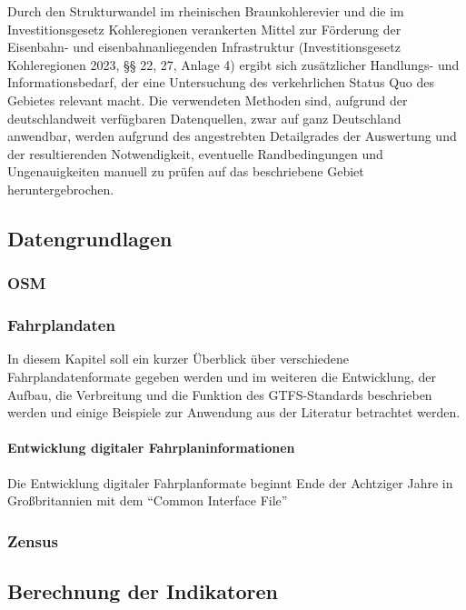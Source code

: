 \documentclass[11pt,a4paper]{scrartcl}
\begin{document}
    Durch den Strukturwandel im rheinischen Braunkohlerevier und die im Investitionsgesetz Kohleregionen verankerten Mittel zur Förderung der Eisenbahn- und eisenbahnanliegenden Infrastruktur (Investitionsgesetz Kohleregionen 2023, §§ 22, 27, Anlage 4) ergibt sich zusätzlicher Handlungs- und Informationsbedarf, der eine Untersuchung des verkehrlichen Status Quo des Gebietes relevant macht. Die verwendeten Methoden sind, aufgrund der deutschlandweit verfügbaren Datenquellen, zwar auf ganz Deutschland anwendbar, werden aufgrund des angestrebten Detailgrades der Auswertung und der resultierenden Notwendigkeit, eventuelle Randbedingungen und Ungenauigkeiten manuell zu prüfen auf das beschriebene Gebiet heruntergebrochen.
    \subsection{Datengrundlagen}
    \subsubsection{OSM}
    \subsubsection{Fahrplandaten}
    In diesem Kapitel soll ein kurzer Überblick über verschiedene Fahrplandatenformate gegeben werden und im weiteren die Entwicklung, der Aufbau, die Verbreitung und die Funktion des GTFS-Standards beschrieben werden und einige Beispiele zur Anwendung aus der Literatur betrachtet werden.
    \paragraph{Entwicklung digitaler Fahrplaninformationen}
    Die Entwicklung digitaler Fahrplanformate beginnt Ende der Achtziger Jahre in Großbritannien mit dem \enquote{Common Interface File} \parencite[1]{nrCIFspec29}
    \subsubsection{Zensus}
    \subsection{Berechnung der Indikatoren}
\end{document}

